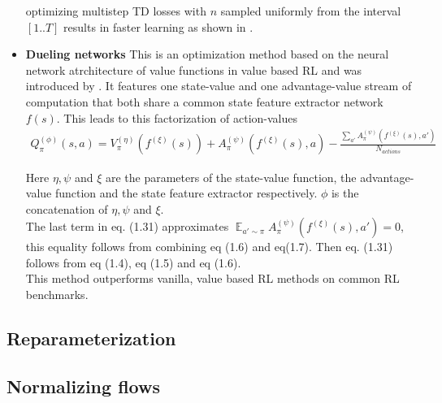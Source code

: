 \begin{itemize}
	optimizing multistep TD losses with $n$ sampled uniformly from the interval $[1..T]$ results in faster learning as shown in \cite{SBQL}.
	
	\item \textbf{Dueling networks} This is an optimization method based on the neural network atrchitecture of value functions in value based RL and was introduced by \cite{DBLP:journals/corr/WangFL15}. It features one state-value and one advantage-value stream of computation that both share a common state feature extractor network $f(s)$. This leads to this factorization of action-values
	\begin{align}
		Q_{\pi}^{(\phi)}(s, a) = V_{\pi}^{(\eta)}(f^{(\xi)}(s)) + A_{\pi}^{(\psi)}(f^{(\xi)}(s), a) - \frac{\sum_{a'} A_{\pi}^{(\psi)}(f^{(\xi)}(s), a')}{N_{actions}}
	\end{align}
	
	Here $\eta, \psi$ and $\xi$ are the parameters of the state-value function, the advantage-value function and the state feature extractor respectively. $\phi$ is the concatenation of $\eta, \psi$ and $\xi$.\\
	The last term in eq. (1.31) approximates $\mathop{\mathbb{E}}_{a' \sim \pi} A_{\pi}^{(\psi)}(f^{(\xi)}(s), a')=0$, this equality follows from combining eq (1.6) and eq(1.7). Then eq. (1.31) follows from eq (1.4), eq (1.5) and eq (1.6).\\
	This method outperforms vanilla, value based RL methods on common RL benchmarks. 
	
\end{itemize}

\subsection{Reparameterization} \label{ssec:reparam}

\subsection{Normalizing flows}\label{ssec:norm_flows}
